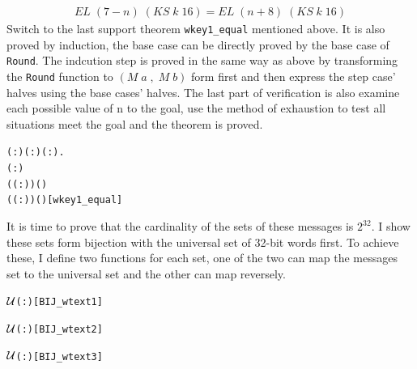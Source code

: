 \documentclass{article}
\begin{document}
\begin{equation*}
\begin{split}
 EL \; (7-n) \; (KS \; k \; 16) = EL \; (n+8) \; (KS \; k \; 16)
\end{split}
\end{equation*}
Switch to the last support theorem \verb|wkey1_equal| mentioned above. It is also proved by induction, the base case can
be directly proved by the base case of \verb|Round|. The indcution step is proved in the same way as above by transforming
the \verb|Round| function to $(M\;a\;,\;M\;b)$ form first and then express the step case' halves using the base cases' halves.
The last part of verification is also examine each possible value of n to the goal, use the method of exhaustion to
test all situations meet the goal and the theorem is proved.

\begin{alltt}
\HOLTokenTurnstile{} \HOLSymConst{\HOLTokenForall{}}( :) ( :) ( :).
        \HOLSymConst{\HOLTokenConj{}}  \HOLSymConst{\HOLTokenLeq{}} ( :) \HOLSymConst{\HOLTokenImp{}}
       (  ( :)) ( ) \HOLSymConst{=}
       (  ( :)) ( )\hfill{[wkey1_equal]}
\end{alltt}

It is time to prove that the cardinality of the sets of these messages is $2^{32}$. I show these sets form bijection with
the universal set of 32-bit words first. To achieve these, I define two functions for each set, one of the two can map the messages
set to the universal set and the other can map reversely.

\begin{alltt}
\HOLTokenTurnstile{}    \ensuremath{{\cal{U}}}(:)\hfill{[BIJ_wtext1]}
\end{alltt}

\begin{alltt}
\HOLTokenTurnstile{}    \ensuremath{{\cal{U}}}(:)\hfill{[BIJ_wtext2]}
\end{alltt}

\begin{alltt}
\HOLTokenTurnstile{}    \ensuremath{{\cal{U}}}(:)\hfill{[BIJ_wtext3]}
\end{alltt}
\end{document}

